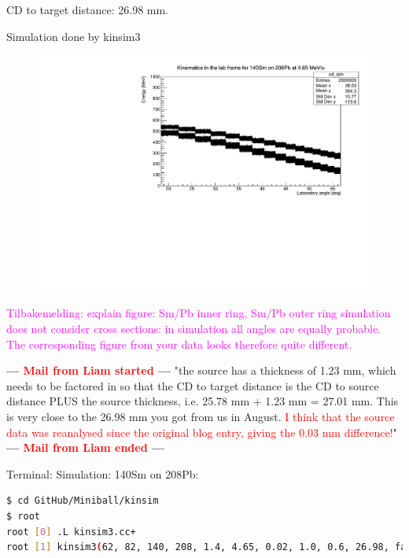 \documentclass[twoside,english]{uiofysmaster/uiofysmaster}
\begin{document}
\bigskip


CD to target distance: 26.98 mm.


Simulation done by kinsim3

\begin{figure}[H]\centering
    \includegraphics[width=\linewidth]{../Plots/simulation/kin_140Sm_208Pb.pdf}
\end{figure}

\textcolor{Magenta}{Tilbakemelding: \newline 
explain figure: Sm/Pb inner ring, Sm/Pb outer ring \newline
simulation does not consider cross sections: in simulation all angles are equally probable. The corresponding figure from your data looks therefore quite different.
}


\textbf{--- \textcolor{red}{Mail from Liam started} ---} \newline
"the source has a thickness of 1.23 mm, which needs to be factored in so that the CD to target distance is the CD to source distance PLUS the source thickness, i.e. 25.78 mm + 1.23 mm =  27.01 mm. 
This is very close to the 26.98 mm you got from us in August. 
\textcolor{red}{I think that the source data was reanalysed since the original blog entry, giving the 0.03 mm difference!}" \newline
\textbf{--- \textcolor{red}{Mail from Liam ended} ---} \newline


Terminal: Simulation: 140Sm on 208Pb:
\begin{lstlisting}[language=sh]
$ cd GitHub/Miniball/kinsim
$ root
root [0] .L kinsim3.cc+
root [1] kinsim3(62, 82, 140, 208, 1.4, 4.65, 0.02, 1.0, 0.6, 26.98, false, 1e6, "../SRIM")
\end{lstlisting}
\end{document}
